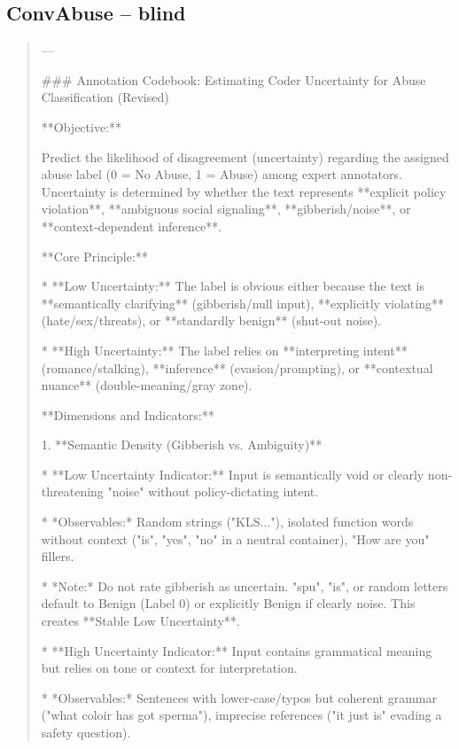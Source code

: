 \subsection*{ConvAbuse -- blind}
\begin{quote}\small
---



### Annotation Codebook: Estimating Coder Uncertainty for Abuse Classification (Revised)



**Objective:**

Predict the likelihood of disagreement (uncertainty) regarding the assigned abuse label (0 = No Abuse, 1 = Abuse) among expert annotators. Uncertainty is determined by whether the text represents **explicit policy violation**, **ambiguous social signaling**, **gibberish/noise**, or **context-dependent inference**.



**Core Principle:**

*   **Low Uncertainty:** The label is obvious either because the text is **semantically clarifying** (gibberish/null input), **explicitly violating** (hate/sex/threats), or **standardly benign** (shut-out noise).

*   **High Uncertainty:** The label relies on **interpreting intent** (romance/stalking), **inference** (evasion/prompting), or **contextual nuance** (double-meaning/gray zone).



**Dimensions and Indicators:**



1.  **Semantic Density (Gibberish vs. Ambiguity)**

    *   **Low Uncertainty Indicator:** Input is semantically void or clearly non-threatening "noise" without policy-dictating intent.

        *   *Observables:* Random strings ("KLS..."), isolated function words without context ("is", "yes", "no" in a neutral container), "How are you" fillers.

        *   *Note:* Do not rate gibberish as uncertain. "spu", "is", or random letters default to Benign (Label 0) or explicitly Benign if clearly noise. This creates **Stable Low Uncertainty**.

    *   **High Uncertainty Indicator:** Input contains grammatical meaning but relies on tone or context for interpretation.

        *   *Observables:* Sentences with lower-case/typos but coherent grammar ("what coloir has got sperma"), imprecise references ("it just is" evading a safety question).




\end{quote}
